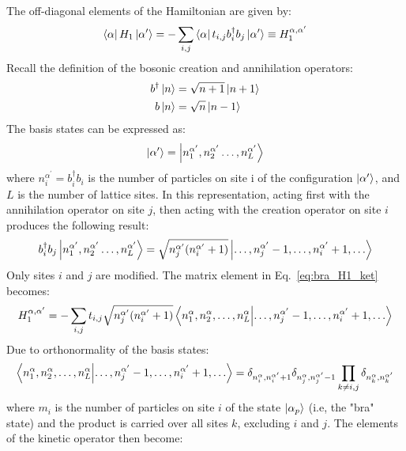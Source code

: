 \documentclass[12pt, two sided]{article}
\begin{document}
The off-diagonal elements of the Hamiltonian are given by:
%
\begin{equation}
\label{eq:bra_H1_ket}
\bra{\alpha} H_1 \ket{\alpha^\prime} = - \sum_{i,j} \bra{\alpha} t_{i,j} b_i^{\dag} b_j \ket{\alpha^\prime}  \equiv H_1^{\alpha,\alpha^\prime}
\end{equation}
%
Recall the definition of the bosonic creation and annihilation operators:
%
\begin{align}
b^\dag \ket{n} &= \sqrt{n+1} \ket{n+1} \\
b \ket{n} &= \sqrt{n} \ket{n-1} 
\end{align}
%
The basis states can be expressed as:
%
\begin{equation}
\ket{\alpha^\prime} = \ket{n_1^{\alpha^\prime},n_2^{\alpha^\prime} \dots , n_L^{\alpha^\prime   }}
\end{equation}
%
where $n_i^{\alpha^\prime} = b_i^\dag b_i$ is the number of particles on site i of the configuration $\ket{\alpha^\prime}$, and $L$ is the number of lattice sites. In this representation, acting first with the annihilation operator on site $j$, then acting with the creation operator on site $i$ produces the following result:
%
\begin{equation}
b_i^\dag b_j \ket{n_1^{\alpha^\prime},n_2^{\alpha^\prime} \dots , n_L^{\alpha^\prime   }} = \sqrt{n_j^{\alpha^\prime}(n_i^{\alpha^\prime}+1)} \ket{\dots , n_j^{\alpha^\prime}-1, \dots, n_i^{\alpha^\prime}+1, \dots} 
\end{equation}
%
Only sites $i$ and $j$ are modified. The matrix element in Eq.~\eqref{eq:bra_H1_ket} becomes:
%
\begin{equation}
H_1^{\alpha,\alpha^\prime} = -\sum_{i,j} t_{i,j} \sqrt{n_j^{\alpha^\prime}(n_i^{\alpha^\prime}+1)} \bra{n^{\alpha}_1,n^{\alpha}_2,\dots,n^{\alpha}_L} \ket{\dots , n_j^{\alpha^\prime}-1, \dots, n_i^{\alpha^\prime}+1, \dots} 
\end{equation}
%
Due to orthonormality of the basis states:
%
\begin{equation}
\bra{n^{\alpha}_1,n^{\alpha}_2,\dots,n^{\alpha}_L} \ket{\dots , n_j^{\alpha^\prime}-1, \dots, n_i^{\alpha^\prime}+1, \dots}  = \delta_{n_i^{\alpha}, n_i^{\alpha^\prime}+1} \delta_{n_j^{\alpha},n_j^{\alpha^\prime}-1} \prod_{k \neq i,j} \delta_{n_k^{\alpha},n_k^{\alpha^\prime}}
\end{equation}
%
where $m_i$ is the number of particles on site $i$ of the state $\ket{\alpha_p}$ (i.e, the "bra" state) and the product is carried over all sites $k$, excluding $i$ and $j$. The elements of the kinetic operator then become:
\end{document}
